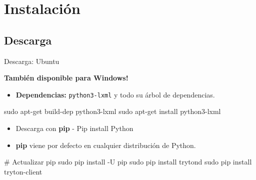 

\section{Instalación}

    \subsection{Descarga}

	\begin{frame}[fragile=singleslide]{Descarga: Ubuntu}

        \begin{center}
            {\color{TurkishRose}\textbf{También disponible para Windows!}}            
        \end{center}

        \fontsize{10}{8}\selectfont

        \begin{itemize}
            \item \textbf{Dependencias:} \texttt{python3-lxml} y todo su árbol de dependencias.
        \end{itemize}

        \begin{mycode}[bash]
sudo apt-get build-dep python3-lxml
sudo apt-get install python3-lxml
		\end{mycode}

        \begin{itemize}
            \item Descarga con \textbf{pip} - Pip install Python
            \item \textbf{pip} viene por defecto en cualquier distribución de Python.
        \end{itemize}

        \begin{mycode}[bash]
# Actualizar pip
sudo pip install -U pip
sudo pip install trytond
sudo pip install tryton-client
        \end{mycode}

    \end{frame}

